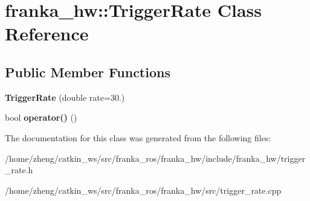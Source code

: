 \hypertarget{classfranka__hw_1_1_trigger_rate}{}\section{franka\+\_\+hw\+:\+:Trigger\+Rate Class Reference}
\label{classfranka__hw_1_1_trigger_rate}
\subsection*{Public Member Functions}
\begin{DoxyCompactItemize}
\item 
\mbox{\label{classfranka__hw_1_1_trigger_rate_a68cde52c634b5bcb56f9276050a52e0d}} 
{\bfseries Trigger\+Rate} (double rate=30.)
\item 
\mbox{\label{classfranka__hw_1_1_trigger_rate_a808b03abfa76f0226ebac665ad8d3ce7}} 
bool {\bfseries operator()} ()
\end{DoxyCompactItemize}


The documentation for this class was generated from the following files\+:\begin{DoxyCompactItemize}
\item 
/home/zheng/catkin\+\_\+ws/src/franka\+\_\+ros/franka\+\_\+hw/include/franka\+\_\+hw/trigger\+\_\+rate.\+h\item 
/home/zheng/catkin\+\_\+ws/src/franka\+\_\+ros/franka\+\_\+hw/src/trigger\+\_\+rate.\+cpp\end{DoxyCompactItemize}
